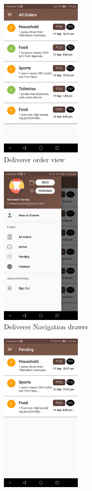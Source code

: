 \documentclass{report}
\begin{document}
\begin{figure}[h!]
\begin{subfigure}[h!]{.24\textwidth}
\centering
\includegraphics[width=4cm]{deliverer_view.jpg}
\caption{\centering Deliverer order view}
\end{subfigure}
\begin{subfigure}[h!]{.24\textwidth}
\centering
\includegraphics[width=4cm]{deliverer_drawer.jpg}
\caption{\centering Deliverer Navigation drawer}
\end{subfigure}
\begin{subfigure}[h!]{.24\textwidth}
\centering
\includegraphics[width=4cm]{pending_orders.jpg}

\end{subfigure}
\end{figure}
\end{document}
